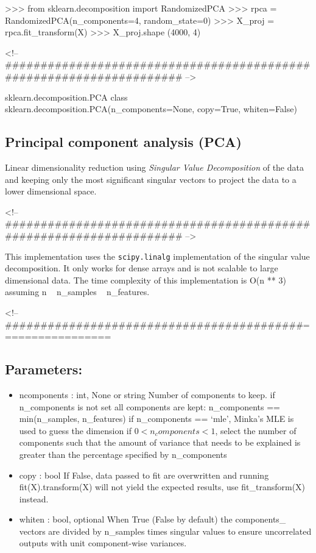 >>> from sklearn.decomposition import RandomizedPCA
>>> rpca = RandomizedPCA(n_components=4, random_state=0)
>>> X_proj = rpca.fit_transform(X)
>>> X_proj.shape
(4000, 4)

<!-- #################################################################### -->


sklearn.decomposition.PCA
class sklearn.decomposition.PCA(n_components=None, copy=True, whiten=False)
\subsection*{Principal component analysis (PCA)}

Linear dimensionality reduction using \textit{Singular Value Decomposition} of the data and keeping only the most significant singular vectors to project the data to a lower dimensional space.

<!-- #################################################################### -->




This implementation uses the \texttt{scipy.linalg} implementation of the singular value decomposition. It only works for dense arrays and is not scalable to large dimensional data.
The time complexity of this implementation is O(n ** 3) assuming n ~ n_samples ~ n_features.

<!-- ##########################################================= %
\subsection*{Parameters:}	
\begin{itemize}
	\item ncomponents : int, None or string
	Number of components to keep. if n_components is not set all components are kept:
	n_components == min(n_samples, n_features)
	if n_components == ‘mle’, Minka’s MLE is used to guess the dimension if $0 < n_components < 1$, select the number of components such that the amount of variance that needs to be explained is greater than the percentage specified by n_components
	\item copy : bool
	If False, data passed to fit are overwritten and running fit(X).transform(X) will not yield the expected results, use fit_transform(X) instead.
	\item whiten : bool, optional
	When True (False by default) the components_ vectors are divided by n_samples times singular values to ensure uncorrelated outputs with unit component-wise variances.
\end{itemize}

